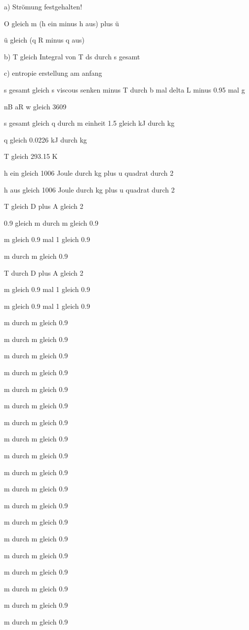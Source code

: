 a) Strömung festgehalten!

O gleich m (h ein minus h aus) plus ü

ü gleich (q R minus q aus)

b) T gleich Integral von T ds durch s gesamt

c) entropie erstellung am anfang

s gesamt gleich s viscous senken minus T durch b mal delta L minus 0.95 mal g

nB aR w gleich 3609

s gesamt gleich q durch m einheit 1.5 gleich kJ durch kg

q gleich 0.0226 kJ durch kg

T gleich 293.15 K

h ein gleich 1006 Joule durch kg plus u quadrat durch 2

h aus gleich 1006 Joule durch kg plus u quadrat durch 2

T gleich D plus A gleich 2

0.9 gleich m durch m gleich 0.9

m gleich 0.9 mal 1 gleich 0.9

m durch m gleich 0.9

T durch D plus A gleich 2

m gleich 0.9 mal 1 gleich 0.9

m gleich 0.9 mal 1 gleich 0.9

m durch m gleich 0.9

m durch m gleich 0.9

m durch m gleich 0.9

m durch m gleich 0.9

m durch m gleich 0.9

m durch m gleich 0.9

m durch m gleich 0.9

m durch m gleich 0.9

m durch m gleich 0.9

m durch m gleich 0.9

m durch m gleich 0.9

m durch m gleich 0.9

m durch m gleich 0.9

m durch m gleich 0.9

m durch m gleich 0.9

m durch m gleich 0.9

m durch m gleich 0.9

m durch m gleich 0.9

m durch m gleich 0.9

